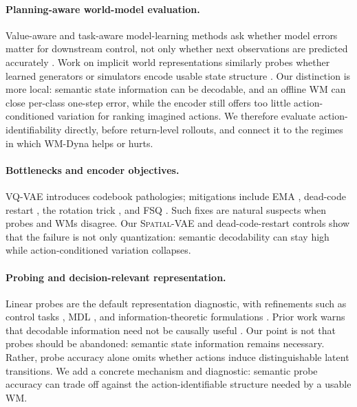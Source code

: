 \documentclass{article}
\newcommand{\encSpatialVAE}{\textsc{Spatial-VAE}}
\begin{document}
\paragraph{Planning-aware world-model evaluation.} Value-aware and task-aware model-learning methods ask whether model errors matter for downstream control, not only whether next observations are predicted accurately \citep{farahmand2018ivaml,gelada2019deepmdp,yuan2023taskaware,hutson2024policyshaped}. Work on implicit world representations similarly probes whether learned generators or simulators encode usable state structure \citep{vafa2024world,li2024llmworlds,zhang2026whatworldmodelslearn}. Our distinction is more local: semantic state information can be decodable, and an offline WM can close per-class one-step error, while the encoder still offers too little action-conditioned variation for ranking imagined actions. We therefore evaluate action-identifiability directly, before return-level rollouts, and connect it to the regimes in which WM-Dyna helps or hurts.

\paragraph{Bottlenecks and encoder objectives.} VQ-VAE \citep{oord2017vqvae} introduces codebook pathologies; mitigations include EMA \citep{razavi2019vqvae2}, dead-code restart \citep{yu2021vqgan,huh2023straightening}, the rotation trick \citep{fifty2025rotation}, and FSQ \citep{mentzer2024fsq}. Such fixes are natural suspects when probes and WMs disagree. Our \encSpatialVAE{} and dead-code-restart controls show that the failure is not only quantization: semantic decodability can stay high while action-conditioned variation collapses.

\paragraph{Probing and decision-relevant representation.} Linear probes \citep{alain2016probes,belinkov2022probing} are the default representation diagnostic, with refinements such as control tasks \citep{hewitt2019control}, MDL \citep{voita2020mdl}, and information-theoretic formulations \citep{pimentel2020info}. Prior work warns that decodable information need not be causally useful \citep{elazar2021amnesic}. Our point is not that probes should be abandoned: semantic state information remains necessary. Rather, probe accuracy alone omits whether actions induce distinguishable latent transitions. We add a concrete mechanism and diagnostic: semantic probe accuracy can trade off against the action-identifiable structure needed by a usable WM.
\end{document}
